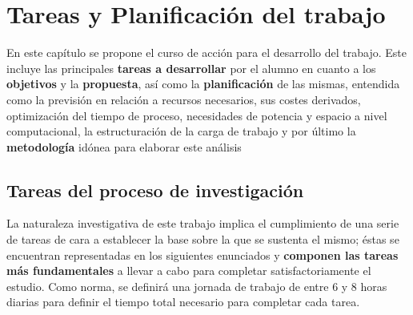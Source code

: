 \chapter{Tareas y Planificación del trabajo}\label{cap:Requisitos}

En este capítulo se propone el curso de acción para el desarrollo del trabajo. Este incluye las principales \textbf{tareas a desarrollar} por el alumno en cuanto a los \textbf{objetivos} y la \textbf{propuesta}, así como la \textbf{planificación} de las mismas, entendida como la previsión en relación a recursos necesarios, sus costes derivados, optimización del tiempo de proceso, necesidades de potencia y espacio a nivel computacional, la estructuración de la carga de trabajo y por último la \textbf{metodología} idónea para elaborar este análisis

\section{Tareas del proceso de investigación}\label{section:Tareas}

La naturaleza investigativa de este trabajo implica el cumplimiento de una serie de tareas de cara a establecer la base sobre la que se sustenta el mismo; éstas se encuentran representadas en los siguientes enunciados y \textbf{componen las tareas más fundamentales }a llevar a cabo para completar satisfactoriamente el estudio. Como norma, se definirá una jornada de trabajo de entre 6 y 8 horas diarias para definir el tiempo total necesario para completar cada tarea.

